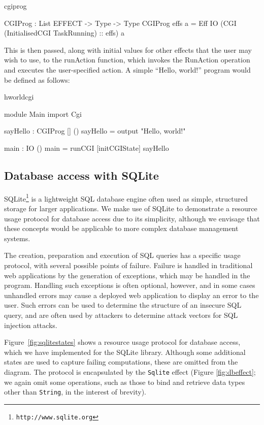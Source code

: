 \begin{SaveVerbatim}{cgiprog}

CGIProg : List EFFECT -> Type -> Type
CGIProg effs a = 
  Eff IO (CGI (InitialisedCGI TaskRunning) :: effs) a

\end{SaveVerbatim}

\noindent
This is then passed, along with initial values for other effects that the user
may wish to use, to the runAction function, which invokes the RunAction
operation and executes the user-specified action.
%
A simple ``Hello, world!'' program would be defined as follows:

\begin{SaveVerbatim}{hworldcgi}

module Main
import Cgi

sayHello : CGIProg [] ()
sayHello = output "Hello, world!"

main : IO ()
main = runCGI [initCGIState] sayHello

\end{SaveVerbatim}

\subsection{Database access with SQLite}

SQLite\footnote{\texttt{http://www.sqlite.org}} is a lightweight SQL database
engine often used as simple, structured storage for larger applications. We
make use of SQLite to demonstrate a resource usage protocol for database access due to its simplicity, although we envisage that these
concepts would be applicable to more complex database management systems. 

The creation, preparation and execution of SQL queries has a specific usage
protocol, with several possible points of failure. Failure is handled in
traditional web applications by the generation of exceptions, which may be
handled in the program.  Handling such exceptions is often optional, however,
and in some cases unhandled errors may cause a deployed web application to
display an error to the user. Such errors can be used to determine the
structure of an insecure SQL query, and are often used by attackers to
determine attack vectors for SQL injection attacks.

Figure~\ref{fig:sqlitestates} shows a resource usage protocol for database
access, which we have implemented for the SQLite library. Although some additional states are used to capture failing computations, these are omitted from the diagram. The protocol is encapsulated
by the \texttt{Sqlite} effect (Figure \ref{fig:dbeffect}; we again omit some operations, such as those to
bind and retrieve data types other than \texttt{String}, in the interest of
brevity).

